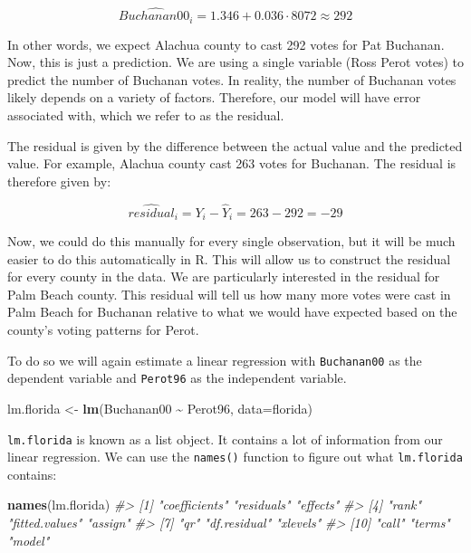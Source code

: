 \documentclass[
]{book}
\newenvironment{Shaded}{\begin{snugshade}}{\end{snugshade}}
\newcommand{\AttributeTok}[1]{\textcolor[rgb]{0.13,0.29,0.53}{#1}}
\newcommand{\CommentTok}[1]{\textcolor[rgb]{0.56,0.35,0.01}{\textit{#1}}}
\newcommand{\FunctionTok}[1]{\textcolor[rgb]{0.13,0.29,0.53}{\textbf{#1}}}
\newcommand{\NormalTok}[1]{#1}
\newcommand{\OtherTok}[1]{\textcolor[rgb]{0.56,0.35,0.01}{#1}}
\newcommand{\SpecialCharTok}[1]{\textcolor[rgb]{0.81,0.36,0.00}{\textbf{#1}}}
\begin{document}
\[
\hat{Buchanan00_i}= 1.346 + 0.036 \cdot 8072 \approx 292
\]

In other words, we expect Alachua county to cast 292 votes for Pat Buchanan. Now, this is just a prediction. We are using a single variable (Ross Perot votes) to predict the number of Buchanan votes. In reality, the number of Buchanan votes likely depends on a variety of factors. Therefore, our model will have error associated with, which we refer to as the residual.

The residual is given by the difference between the actual value and the predicted value. For example, Alachua county cast 263 votes for Buchanan. The residual is therefore given by:

\[
\hat{residual}_i = Y_i - \hat{Y}_i=263-292 = -29
\]

Now, we could do this manually for every single observation, but it will be much easier to do this automatically in R. This will allow us to construct the residual for every county in the data. We are particularly interested in the residual for Palm Beach county. This residual will tell us how many more votes were cast in Palm Beach for Buchanan relative to what we would have expected based on the county's voting patterns for Perot.

To do so we will again estimate a linear regression with \texttt{Buchanan00} as the dependent variable and \texttt{Perot96} as the independent variable.

\begin{Shaded}
\begin{Highlighting}[]
\NormalTok{lm.florida }\OtherTok{\textless{}{-}} \FunctionTok{lm}\NormalTok{(Buchanan00 }\SpecialCharTok{\textasciitilde{}}\NormalTok{ Perot96, }\AttributeTok{data=}\NormalTok{florida)}
\end{Highlighting}
\end{Shaded}

\texttt{lm.florida} is known as a list object. It contains a lot of information from our linear regression. We can use the \texttt{names()} function to figure out what \texttt{lm.florida} contains:

\begin{Shaded}
\begin{Highlighting}[]
\FunctionTok{names}\NormalTok{(lm.florida)}
\CommentTok{\#\textgreater{}  [1] "coefficients"  "residuals"     "effects"      }
\CommentTok{\#\textgreater{}  [4] "rank"          "fitted.values" "assign"       }
\CommentTok{\#\textgreater{}  [7] "qr"            "df.residual"   "xlevels"      }
\CommentTok{\#\textgreater{} [10] "call"          "terms"         "model"}
\end{Highlighting}
\end{Shaded}
\end{document}
